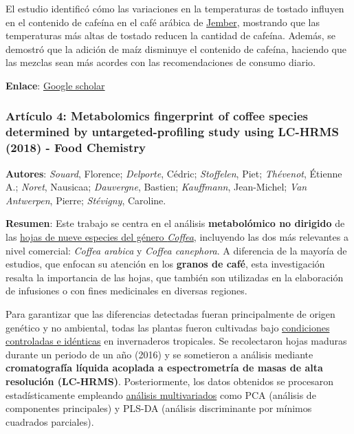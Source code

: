 \documentclass{article}
\begin{document}
El estudio identificó cómo las variaciones en la temperaturas de tostado influyen en el contenido de cafeína en el café arábica de \underline{Jember}, mostrando que las temperaturas más altas de tostado reducen la cantidad de cafeína. Además, se demostró que la adición de maíz disminuye el contenido de cafeína, haciendo que las mezclas sean más acordes con las recomendaciones de consumo diario. \vspace{0.5cm}

\textbf{Enlace}: \href{https://iopscience.iop.org/article/10.1088/1757-899X/1173/1/012012/meta}{Google scholar} \vspace{0.5cm}

\subsubsection{\textbf{Artículo 4:} \textcolor{Pesto}{\textbf{Metabolomics fingerprint of coffee species determined by untargeted-profiling study using LC-HRMS (2018) - Food Chemistry}}} \vspace{0.5cm}

\textbf{Autores}: \textit{Souard}, Florence; \textit{Delporte}, Cédric; \textit{Stoffelen}, Piet; \textit{Th\'evenot}, Étienne A.; \textit{Noret}, Nausicaa; \textit{Dauvergne}, Bastien; \textit{Kauffmann}, Jean-Michel; \textit{Van Antwerpen}, Pierre; \textit{Stévigny}, Caroline. \vspace{0.5cm}

\textbf{Resumen}: Este trabajo se centra en el análisis \textbf{metabolómico no dirigido} de las \underline{hojas de nueve especies del género \textit{Coffea}}, incluyendo las dos más relevantes a nivel comercial: \textit{Coffea arabica} y \textit{Coffea canephora}. A diferencia de la mayoría de estudios, que enfocan su atención en los \textbf{granos de café}, esta investigación resalta la importancia de las hojas, que también son utilizadas en la elaboración de infusiones o con fines medicinales en diversas regiones. 

Para garantizar que las diferencias detectadas fueran principalmente de origen genético y no ambiental, todas las plantas fueron cultivadas bajo \underline{condiciones controladas e idénticas} en invernaderos tropicales. Se recolectaron hojas maduras durante un periodo de un año (2016) y se sometieron a análisis mediante \textbf{cromatografía líquida acoplada a espectrometría de masas de alta resolución (LC-HRMS)}. Posteriormente, los datos obtenidos se procesaron estadísticamente empleando \underline{análisis multivariados} como PCA (análisis de componentes principales) y PLS-DA (análisis discriminante por mínimos cuadrados parciales). \vspace{0.5cm}
\end{document}

